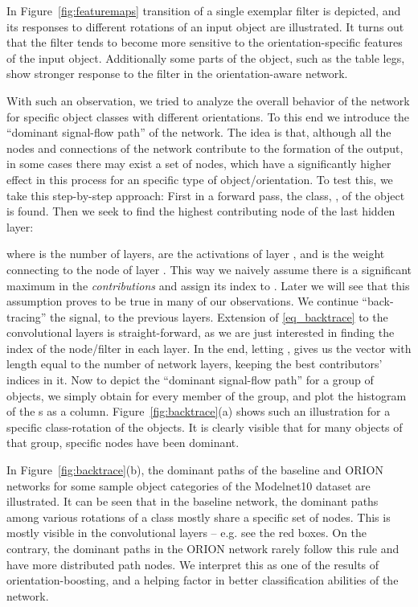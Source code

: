 \documentclass{bmvc2k}
\begin{document}
In Figure~\ref{fig:featuremaps} transition of a single exemplar filter is depicted, and its responses to different rotations of an input object are illustrated. It turns out that the filter tends to become more sensitive to the orientation-specific features of the input object. Additionally some parts of the object, such as the table legs, show stronger response to the filter in the orientation-aware network.

With such an observation, we tried to analyze the overall behavior of the network for specific object classes with different orientations. To this end we introduce the ``dominant signal-flow path'' of the network. The idea is that, although all the nodes and connections of the network contribute to the formation of the output, in some cases there may exist a set of nodes, which have a significantly higher effect in this process for an specific type of object/orientation. To test this, we take this step-by-step approach: First in a forward pass, the class, , of the object is found. Then we seek to find the highest contributing node of the last hidden layer:



where  is the number of layers,  are the activations of layer , and  is the weight connecting  to the  node of layer . This way we naively assume there is a significant maximum in the \emph{contributions} and assign its index to . Later we will see that this assumption proves to be true in many of our observations. We continue ``back-tracing'' the signal, to the previous layers. Extension of \eqref{eq_backtrace} to the convolutional layers is straight-forward, as we are just interested in finding the index of the node/filter in each layer. In the end, letting , gives us the vector  with length equal to the number of network layers, keeping the best contributors' indices in it.
Now to depict the ``dominant signal-flow path'' for a group of objects, we simply obtain  for every member of the group, and plot the histogram of the s as a column. Figure~\ref{fig:backtrace}(a) shows such an illustration for a specific class-rotation of the objects. It is clearly visible that for many objects of that group, specific nodes have been dominant.

In Figure~\ref{fig:backtrace}(b), the dominant paths of the baseline and ORION networks for some sample object categories of the Modelnet10 dataset are illustrated. It can be seen that in the baseline network, the dominant paths among various rotations of a class mostly share a specific set of nodes. This is mostly visible in the convolutional layers -- e.g. see the red boxes. On the contrary, the dominant paths in the ORION network rarely follow this rule and have more distributed path nodes. We interpret this as one of the results of orientation-boosting, and a helping factor in better classification abilities of the network.
\end{document}
